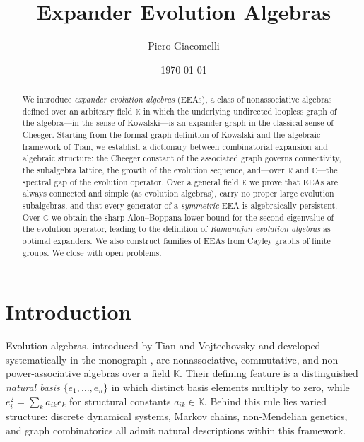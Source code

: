 \documentclass[12pt,a4paper]{amsart}
\title{Expander Evolution Algebras}
\author{Piero Giacomelli}
\date{\today}
\theoremstyle{definition}
\newcommand{\K}{\mathbb{K}}
\newcommand{\R}{\mathbb{R}}
\newcommand{\C}{\mathbb{C}}
\begin{document}

\begin{abstract}
We introduce \emph{expander evolution algebras} (EEAs), a class of
nonassociative algebras defined over an arbitrary field $\K$ in which
the underlying undirected loopless graph of the algebra---in the sense
of Kowalski---is an expander graph in the classical sense of Cheeger.
Starting from the formal graph definition of Kowalski and the algebraic
framework of Tian, we establish a dictionary between combinatorial
expansion and algebraic structure: the Cheeger constant of the
associated graph governs connectivity, the subalgebra lattice, the
growth of the evolution sequence, and---over $\R$ and $\C$---the
spectral gap of the evolution operator.  Over a general field $\K$ we
prove that EEAs are always connected and simple (as evolution algebras),
carry no proper large evolution subalgebras, and that every generator of
a \emph{symmetric} EEA is algebraically persistent.  Over $\C$ we
obtain the sharp Alon--Boppana lower bound for the second eigenvalue of
the evolution operator, leading to the definition of
\emph{Ramanujan evolution algebras} as optimal expanders.  We also
construct families of EEAs from Cayley graphs of finite groups.
We close with open problems.
\end{abstract}

\maketitle

\section{Introduction}

Evolution algebras, introduced by Tian and Vojtechovsky \cite{TianVojtechovsky2006}
and developed systematically in the monograph \cite{Tian2008}, are
nonassociative, commutative, and non-power-associative algebras over a
field $\K$.  Their defining feature is a distinguished \emph{natural
basis} $\{e_1,\ldots,e_n\}$ in which distinct basis elements multiply
to zero, while $e_i^2 = \sum_k a_{ik} e_k$ for structural constants
$a_{ik}\in\K$.  Behind this rule lies varied structure: discrete dynamical systems, Markov chains,
non-Mendelian genetics, and graph combinatorics all admit natural
descriptions within this framework.
\end{document}
